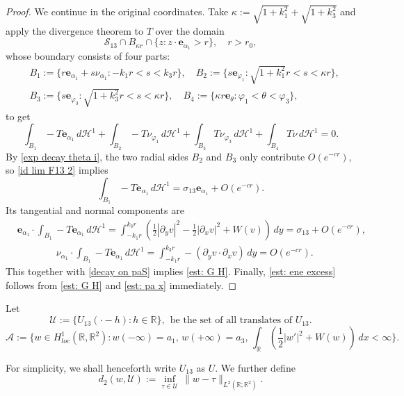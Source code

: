 \documentclass[leqno,11pt]{amsart}
\let\pa=\partial
\let\al=\alpha
\let\f=\frac
\let\pa=\partial
\theoremstyle{remark}
\newcommand{\BR}{\mathbb{R}}
\newcommand{\ch}{\mathcal{H}^1}
\begin{document}
\begin{proof}
We continue in the original coordinates. Take $\kappa:= \sqrt{1+k_1^2}+\sqrt{1+k_3^2}$ and apply the divergence theorem to $T$ over the domain 
\[
\mathcal{S}_{13}\cap B_{\kappa r}\cap \{z: z\cdot \mathbf{e}_{\al_1}>r\},\quad r>r_0,
\]
whose boundary consists of four parts:
\begin{align*}
&B_1:=\{r\mathbf{e}_{\al_1}+s\nu_{\al_1}: -k_1r<s<k_3 r\},\quad B_2:=\{s\mathbf{e}_{\varphi_1}: \sqrt{1+k_1^2}r<s<\kappa r\},\\
&B_3:=\{s\mathbf{e}_{\varphi_3}: \sqrt{1+k_3^2}r<s<\kappa r\},\quad B_4:=\{\kappa r\mathbf{e}_{\theta}:\varphi_1<\theta<\varphi_3\},
\end{align*}
to get
\begin{equation}
    \int_{B_1}-T\mathbf{e}_{\al_1}\,d\ch+ \int_{B_2} -T\nu_{\varphi_1}\,d\ch+\int_{B_3} T\nu_{\varphi_3}\,d\ch +\int_{B_4} T\nu\,d\ch=0. 
\end{equation}
By \eqref{exp decay theta i}, the two  radial sides $B_2$ and $B_3$ only contribute $O(e^{-cr})$, so \eqref{id lim F13 2} implies
\[
\int_{B_1}-T\mathbf{e}_{\al_1}\,d\ch=  \sigma_{13}\mathbf{e}_{\al_1}+O(e^{-cr}).
\]
Its tangential and normal components are
\begin{equation}
 \begin{split}
 &\mathbf{e}_{\al_1}\cdot\int_{B_1}-T\mathbf{e}_{\al_1}\,d\ch= \int_{-k_1r}^{k_3r} \left(\f12|\pa_y v|^2-\f12|\pa_x v|^2+W(v)\right)\,dy =\sigma_{13}+O(e^{-cr}),\\
 &\qquad\qquad\nu_{\al_1}\cdot\int_{B_1}-T\mathbf{e}_{\al_1}\,d\ch= \int_{-k_1r}^{k_3r} -\left(\pa_y v\cdot\pa_x v\right)\,dy =O(e^{-cr}).
 \end{split}
\end{equation}
This together with \eqref{decay on paS} implies \eqref{est: G H}. Finally, \eqref{est: ene excess} follows from \eqref{est: G H} and \eqref{est: pa x} immediately. 

\end{proof}


Let
\begin{equation*}
    \mathcal{U}:=\{U_{13}(\cdot-h): h\in\BR\},\ \ \text{be the set of all translates of $U_{13}$}.
\end{equation*}
\begin{equation*}
    \mathcal{A}:=\{w\in H_{loc}^1(\BR,\BR^2): w(-\infty)=a_1,\,w(+\infty)=a_3,\, \int_{\BR}(\f12|w'|^2+W(w))\,dx<\infty\}.
\end{equation*}

For simplicity, we shall henceforth write $U_{13}$ as $U$. We further define 
\begin{equation*}
d_2(w, \mathcal{U}):= \inf\limits_{\tau\in \mathcal{U}}\,\| w-\tau\|_{L^2(\BR;\BR^2)}.
\end{equation*}
\end{document}
